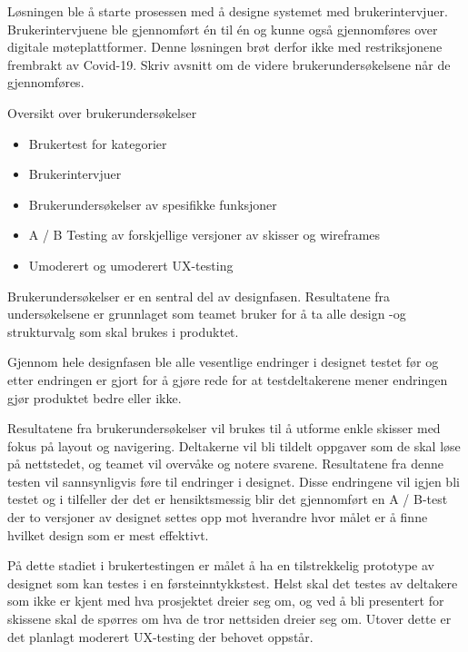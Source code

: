 Løsningen ble å starte prosessen med å designe systemet med brukerintervjuer. Brukerintervjuene ble gjennomført én til én og kunne også gjennomføres over digitale møteplattformer. Denne løsningen brøt derfor ikke med restriksjonene frembrakt av Covid-19.\newline
Skriv avsnitt om de videre brukerundersøkelsene når de gjennomføres.\newline

Oversikt over brukerundersøkelser
\begin{itemize}
\item Brukertest for kategorier
\item Brukerintervjuer
\item Brukerundersøkelser av spesifikke funksjoner
\item A / B Testing av forskjellige versjoner av skisser og wireframes
\item Umoderert og umoderert UX-testing
\end{itemize}

Brukerundersøkelser er en sentral del av designfasen. Resultatene fra undersøkelsene er grunnlaget som teamet bruker for å ta alle design -og strukturvalg som skal brukes i produktet.\newline 

Gjennom hele designfasen ble alle vesentlige endringer i designet testet før og etter endringen er gjort for å gjøre rede for at testdeltakerene mener endringen gjør produktet bedre eller ikke.

Resultatene fra brukerundersøkelser vil brukes til å utforme enkle skisser med fokus på layout og navigering. Deltakerne vil bli tildelt oppgaver som de skal løse på nettstedet, og teamet vil overvåke og notere svarene. Resultatene fra denne testen vil sannsynligvis føre til endringer i designet. Disse endringene vil igjen bli testet og i tilfeller der det er hensiktsmessig blir det gjennomført en A / B-test der to versjoner av designet settes opp mot hverandre hvor målet er å finne hvilket design som er mest effektivt.\newline

På dette stadiet i brukertestingen er målet å ha en tilstrekkelig prototype av designet som kan testes i en førsteinntykkstest. Helst skal det testes av deltakere som ikke er kjent med hva prosjektet dreier seg om, og ved å bli presentert for skissene skal de spørres om hva de tror nettsiden dreier seg om.\newline
Utover dette er det planlagt moderert UX-testing der behovet oppstår.

